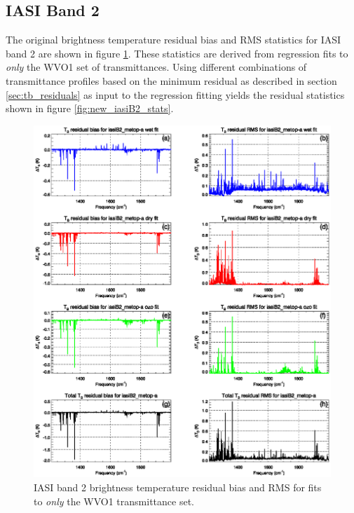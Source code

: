 \subsection{IASI Band 2}
The original brightness temperature residual bias and RMS statistics for IASI band 2 are shown in figure \ref{fig:old_iasiB2_stats}. These statistics are derived from regression fits to \emph{only} the WVO1 set of transmittances. Using different combinations of transmittance profiles based on the minimum residual as described in section \ref{sec:tb_residuals} as input to the regression fitting yields the residual statistics shown in figure \ref{fig:new_iasiB2_stats}. 
\begin{figure}[htp]
  \centering
  \includegraphics[scale=0.8]{graphics/stats/old/iasiB2_metop-a.FitStats.eps}
  \caption{IASI band 2 brightness temperature residual bias and RMS for fits to \emph{only} the WVO1 transmittance set.}
  \label{fig:old_iasiB2_stats}
\end{figure}
